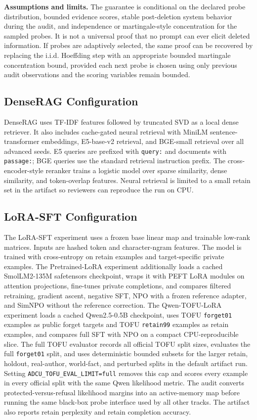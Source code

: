 \textbf{Assumptions and limits.}
The guarantee is conditional on the declared probe distribution, bounded evidence scores, stable post-deletion system behavior during the audit, and independence or martingale-style concentration for the sampled probes. It is not a universal proof that no prompt can ever elicit deleted information. If probes are adaptively selected, the same proof can be recovered by replacing the i.i.d. Hoeffding step with an appropriate bounded martingale concentration bound, provided each next probe is chosen using only previous audit observations and the scoring variables remain bounded.

\subsection{DenseRAG Configuration}

DenseRAG uses TF-IDF features followed by truncated SVD as a local dense retriever. It also includes cache-gated neural retrieval with MiniLM sentence-transformer embeddings, E5-base-v2 retrieval, and BGE-small retrieval over all advanced seeds. E5 queries are prefixed with \texttt{query:} and documents with \texttt{passage:}; BGE queries use the standard retrieval instruction prefix. The cross-encoder-style reranker trains a logistic model over sparse similarity, dense similarity, and token-overlap features. Neural retrieval is limited to a small retain set in the artifact so reviewers can reproduce the run on CPU.

\subsection{LoRA-SFT Configuration}

The LoRA-SFT experiment uses a frozen base linear map and trainable low-rank matrices. Inputs are hashed token and character-ngram features. The model is trained with cross-entropy on retain examples and target-specific private examples. The Pretrained-LoRA experiment additionally loads a cached SmolLM2-135M safetensors checkpoint, wraps it with PEFT LoRA modules on attention projections, fine-tunes private completions, and compares filtered retraining, gradient ascent, negative SFT, NPO with a frozen reference adapter, and SimNPO without the reference correction. The Qwen-TOFU-LoRA experiment loads a cached Qwen2.5-0.5B checkpoint, uses TOFU \texttt{forget01} examples as public forget targets and TOFU \texttt{retain99} examples as retain examples, and compares full SFT with NPO on a compact CPU-reproducible slice. The full TOFU evaluator records all official TOFU split sizes, evaluates the full \texttt{forget01} split, and uses deterministic bounded subsets for the larger retain, holdout, real-author, world-fact, and perturbed splits in the default artifact run. Setting \texttt{ADCU\_TOFU\_EVAL\_LIMIT=full} removes this cap and scores every example in every official split with the same Qwen likelihood metric. The audit converts protected-versus-refusal likelihood margins into an active-memory map before running the same black-box probe interface used by all other tracks. The artifact also reports retain perplexity and retain completion accuracy.

